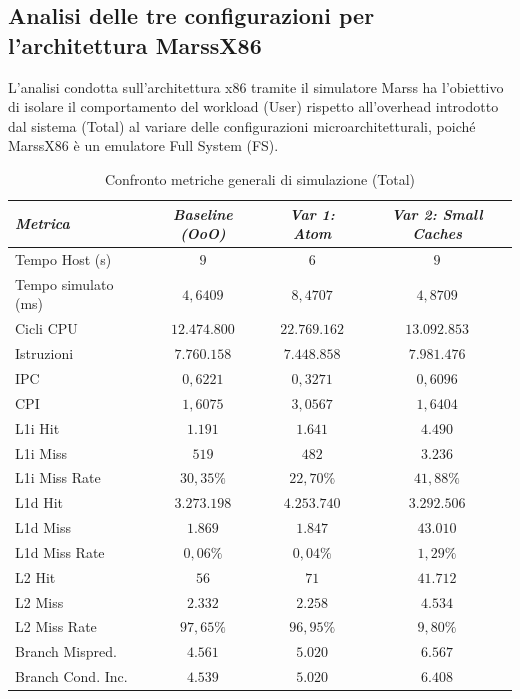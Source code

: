 \documentclass[../../main_document/main.tex]{subfiles}
\begin{document}
\subsection{Analisi delle tre configurazioni per l'architettura MarssX86}
L'analisi condotta sull'architettura x86 tramite il simulatore Marss ha l'obiettivo di isolare il comportamento del workload (User) rispetto all'overhead introdotto dal sistema (Total) al variare delle configurazioni microarchitetturali, poiché MarssX86 è un emulatore Full System (FS).

\vspace{8pt}
\begin{table}[tbh]
    \begin{center}
        \begin{tabular}{|l|c|c|c|}
            \hline
                \textit{Metrica} & 
                \textit{Baseline (OoO)} & 
                \textit{Var 1: Atom} & 
                \textit{Var 2: Small Caches} \\
            \hline
            Tempo Host (s) & $9$ & $6$ & $9$ \\
            Tempo simulato (ms) & $4,6409$ & $8,4707$ & $4,8709$ \\
            Cicli CPU & $12.474.800$ & $22.769.162$ & $13.092.853$ \\
            Istruzioni & $7.760.158$ & $7.448.858$ & $7.981.476$ \\
            IPC & $0,6221$ & $0,3271$ & $0,6096$ \\
            CPI & $1,6075$ & $3,0567$ & $1,6404$ \\
            L1i Hit & $1.191$ & $1.641$ & $4.490$ \\
            L1i Miss & $519$ & $482$ & $3.236$ \\
            L1i Miss Rate & $30,35\%$ & $22,70\%$ & $41,88\%$ \\
            L1d Hit & $3.273.198$ & $4.253.740$ & $3.292.506$ \\
            L1d Miss & $1.869$ & $1.847$ & $43.010$ \\
            L1d Miss Rate & $0,06\%$ & $0,04\%$ & $1,29\%$ \\
            L2 Hit & $56$ & $71$ & $41.712$ \\
            L2 Miss & $2.332$ & $2.258$ & $4.534$ \\
            L2 Miss Rate & $97,65\%$ & $96,95\%$ & $9,80\%$ \\
            Branch Mispred. & $4.561$ & $5.020$ & $6.567$ \\
            Branch Cond. Inc. & $4.539$ & $5.020$ & $6.408$ \\
            \hline
        \end{tabular}
        \caption{Confronto metriche generali di simulazione (Total)}
        \label{tab: tab_3}
    \end{center}
\end{table}
\end{document}
